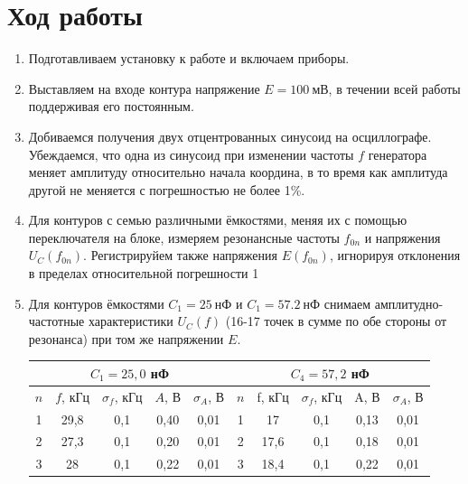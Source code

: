 \documentclass[a4paper,12pt]{article}
\begin{document}
\section{Ход работы}
\begin{enumerate}
\item Подготавливаем установку к работе и включаем приборы.
\item Выставляем на входе контура напряжение $E = 100~\text{мВ}$, в течении всей работы поддерживая его постоянным.
\item Добиваемся получения двух отцентрованных синусоид на осциллографе. Убеждаемся, что одна из синусоид при изменении частоты $f$ генератора меняет амплитуду относительно начала координа, в то время как амплитуда другой не меняется с погрешностью не более 1\%.
\item Для контуров с семью различными ёмкостями, меняя их с помощью переключателя на
блоке, измеряем резонансные частоты $f_{0n}$ и напряжения $U_C(f_{0n})$. Регистрируйем также
напряжения $E(f_{0n})$, игнорируя отклонения в пределах относительной погрешности 1%
\item Для контуров ёмкостями $C_1 = 25~\text{нФ}$ и $C_1 = 57.2~\text{нФ}$ снимаем амплитудно-частотные характеристики $U_C(f)$ (16-17 точек
в сумме по обе стороны от резонанса) при том же напряжении $E$.
\begin{table}[h]
\centering
\begin{tabular}{ccccc||c|c|c|c|c|}
\hline
\multicolumn{5}{|c||}{$C_1 = 25,0$ нФ}                                                                                                         & \multicolumn{5}{c|}{$C_4 = 57,2$ нФ}        \\ \hline
\multicolumn{1}{|c|}{$n$} & \multicolumn{1}{c|}{$f$, кГц} & \multicolumn{1}{c|}{$\sigma_f$, кГц} & \multicolumn{1}{c|}{$A$, В} & $\sigma_A$, В         & $n$ & f, кГц & $\sigma_f$, кГц & A, В & $\sigma_A$, В \\ \hline
\multicolumn{1}{|c|}{1}   & \multicolumn{1}{c|}{29,8}     & \multicolumn{1}{c|}{0,1}             & \multicolumn{1}{c|}{0,40}   & 0,01                  & 1   & 17     & 0,1             & 0,13 & 0,01          \\ \hline
\multicolumn{1}{|c|}{2}   & \multicolumn{1}{c|}{27,3}     & \multicolumn{1}{c|}{0,1}             & \multicolumn{1}{c|}{0,20}   & 0,01                  & 2   & 17,6   & 0,1             & 0,18 & 0,01          \\ \hline
\multicolumn{1}{|c|}{3}   & \multicolumn{1}{c|}{28}       & \multicolumn{1}{c|}{0,1}             & \multicolumn{1}{c|}{0,22}   & 0,01                  & 3   & 18,4   & 0,1             & 0,22 & 0,01          \\ \hline

\end{tabular}
\end{table}
\end{enumerate}
\end{document}
